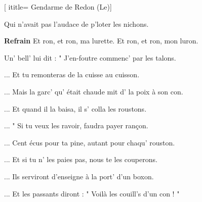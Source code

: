  [
ititle= {Gendarme de Redon (Le)}]

\beginverse
{}
Qui n'avait pas l'audace de p'loter les nichons.
\endverse

\beginchorus
\textbf {Refrain}
Et ron, et ron, ma lurette.
Et ron, et ron, mon luron.
\endchorus

\beginverse
{}
Un' bell' lui dit : " J'en-foutre commenc' par les talons.
\endverse

\beginverse
... Et tu remonteras de la cuisse au cuisson.
\endverse

\beginverse
... Mais la garc' qu' était chaude mit d' la poix à son con.
\endverse

\beginverse
... Et quand il la baisa, il s' colla les roustons.
\endverse

\beginverse
... " Si tu veux les ravoir, faudra payer rançon.
\endverse

\beginverse
... Cent écus pour ta pine, autant pour chaqu' rouston.
\endverse

\beginverse
... Et si tu n' les paies pas, nous te les couperons.
\endverse

\beginverse
... Ils serviront d'enseigne à la port' d'un boxon.
\endverse

\beginverse
... Et les passants diront : " Voilà les couill's d'un con ! "
\endverse

\endsong